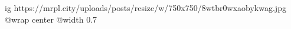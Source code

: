  
 
 
 
 

\ifcmt
  ig https://mrpl.city/uploads/posts/resize/w/750x750/8wtbr0wxaobykwag.jpg
  @wrap center
  @width 0.7
\fi
